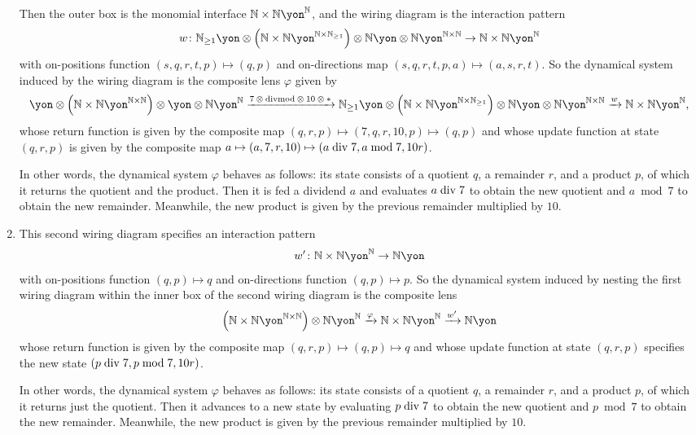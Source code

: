 \documentclass[Book-Poly]{subfiles}
\begin{document}
\begin{exercise}
\begin{solution}
\begin{enumerate}
    Then the outer box is the monomial interface $\nn\times\nn\yon^\nn$, and the wiring diagram is the interaction pattern
    \[
        w\colon\nn_{\geq1}\yon\otimes\left(\nn\times\nn\yon^{\nn\times\nn_{\geq1}}\right)\otimes\nn\yon\otimes\nn\yon^{\nn\times\nn}\to\nn\times\nn\yon^\nn
    \]
    with on-positions function $(s,q,r,t,p)\mapsto(q,p)$ and on-directions map $(s,q,r,t,p,a)\mapsto(a,s,r,t)$.
    So the dynamical system induced by the wiring diagram is the composite lens $\varphi$ given by
    \[
        \yon\otimes\left(\nn\times\nn\yon^{\nn\times\nn}\right)\otimes\yon\otimes\nn\yon^\nn\To{7\:\otimes\:\fun{divmod}\:\otimes\:10\:\otimes\:\ast}\nn_{\geq1}\yon\otimes\left(\nn\times\nn\yon^{\nn\times\nn_{\geq1}}\right)\otimes\nn\yon\otimes\nn\yon^{\nn\times\nn}\To{w}\nn\times\nn\yon^\nn,
    \]
    whose return function is given by the composite map $(q,r,p)\mapsto(7,q,r,10,p)\mapsto(q,p)$ and whose update function at state $(q,r,p)$ is given by the composite map $a\mapsto(a,7,r,10)\mapsto(a\bdiv7,a\bmod7,10r)$.

    In other words, the dynamical system $\varphi$ behaves as follows: its state consists of a quotient $q$, a remainder $r$, and a product $p$, of which it returns the quotient and the product.
    Then it is fed a dividend $a$ and evaluates $a\bdiv7$ to obtain the new quotient and $a\bmod7$ to obtain the new remainder.
    Meanwhile, the new product is given by the previous remainder multiplied by $10$.

    \item This second wiring diagram specifies an interaction pattern
    \[
        w'\colon\nn\times\nn\yon^\nn\to\nn\yon
    \]
    with on-positions function $(q,p)\mapsto q$ and on-directions function $(q,p)\mapsto p$.
    So the dynamical system induced by nesting the first wiring diagram within the inner box of the second wiring diagram is the composite lens
    \[
        \left(\nn\times\nn\yon^{\nn\times\nn}\right)\otimes\nn\yon^\nn\To{\varphi}\nn\times\nn\yon^\nn\To{w'}\nn\yon
    \]
    whose return function is given by the composite map $(q,r,p)\mapsto(q,p)\mapsto q$ and whose update function at state $(q,r,p)$ specifies the new state $(p\bdiv7,p\bmod7,10r)$.

    In other words, the dynamical system $\varphi$ behaves as follows: its state consists of a quotient $q$, a remainder $r$, and a product $p$, of which it returns just the quotient.
    Then it advances to a new state by evaluating $p\bdiv7$ to obtain the new quotient and $p\bmod7$ to obtain the new remainder.
    Meanwhile, the new product is given by the previous remainder multiplied by $10$.


\end{enumerate}
\end{solution}
\end{exercise}
\end{document}
